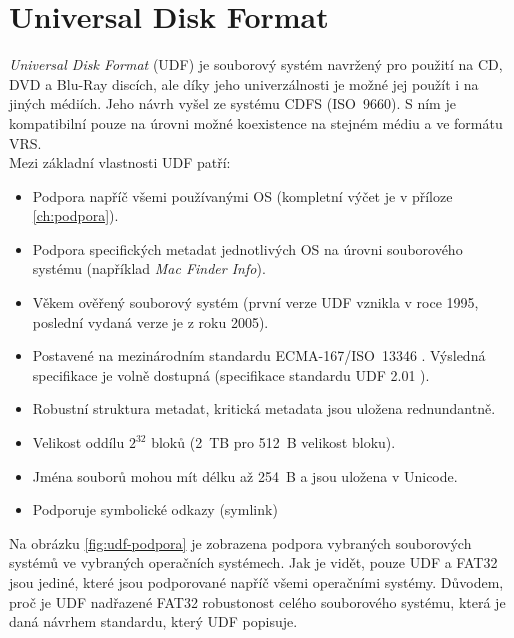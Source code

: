 \chapter{Universal Disk Format}
\label{ch:udf}
\textit{Universal Disk Format} (UDF) je souborový systém navržený pro použití na CD, DVD a Blu-Ray discích, ale díky jeho univerzálnosti je možné jej použít i na jiných médiích. Jeho návrh vyšel ze systému CDFS (ISO~9660). S ním je kompatibilní pouze na úrovni možné koexistence na stejném médiu a ve formátu VRS.\\
Mezi základní vlastnosti UDF patří:
\begin{itemize}
    \item Podpora napříč všemi používanými OS (kompletní výčet je v příloze \ref{ch:podpora}).
    \item Podpora specifických metadat jednotlivých OS na úrovni souborového systému (například \textit{Mac Finder Info}).
    \item Věkem ověřený souborový systém (první verze UDF vznikla v roce 1995, poslední vydaná verze je z roku 2005).
    \item Postavené na mezinárodním standardu ECMA-167/ISO~13346 \cite{ecma-167}. Výsledná specifikace je volně dostupná (specifikace standardu UDF 2.01 \cite{osta-udf-0201}).
    \item Robustní struktura metadat, kritická metadata jsou uložena rednundantně.
    \item Velikost oddílu $2^{32}$ bloků (2~TB pro 512~B velikost bloku).
    \item Jména souborů mohou mít délku až 254~B a jsou uložena v Unicode.
    \item Podporuje symbolické odkazy (symlink)
\end{itemize}
Na obrázku \ref{fig:udf-podpora} je zobrazena podpora vybraných souborových systémů ve vybraných operačních systémech. Jak je vidět, pouze UDF a FAT32 jsou jediné, které jsou podporované napříč všemi operačními systémy. Důvodem, proč je UDF nadřazené FAT32 robustonost celého souborového systému, která je daná návrhem standardu, který UDF popisuje.
